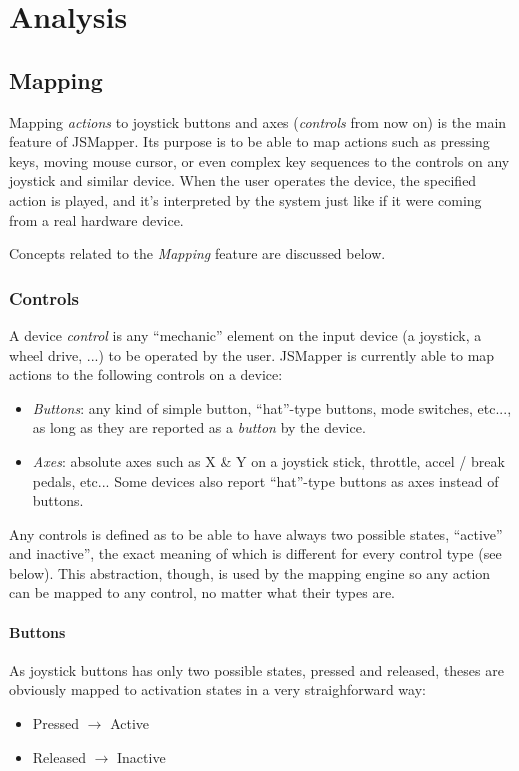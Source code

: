 \chapter{Analysis}\label{chap:analysis}

\section{Mapping}
Mapping \emph{actions} to joystick buttons and axes (\emph{controls} from now on) is the main feature of JSMapper. Its purpose is to be able to map actions such as pressing keys, moving mouse cursor, or even complex key sequences to the controls on any joystick and similar device. When the user operates the device, the specified action is played, and it's interpreted by the system just like if it were coming from a real hardware device.

Concepts related to the \emph{Mapping} feature are discussed below.

\subsection{Controls}
A device \emph{control} is any ``mechanic'' element on the input device (a joystick, a wheel drive, ...) to be operated by the user. JSMapper is currently able to map actions to the following controls on a device:
\begin{itemize}
	\item \emph{Buttons}: any kind of simple button, ``hat''-type buttons, mode switches, etc..., as long as they are reported as a \emph{button} by the device.
	\item \emph{Axes}: absolute axes such as X \& Y on a joystick stick, throttle, accel / break pedals, etc... Some devices also report ``hat''-type buttons as axes instead of buttons.
\end{itemize}

Any controls is defined as to be able to have always two possible states, ``active'' and inactive'', the exact meaning of which is different for every control type (see below). This abstraction, though, is used by the mapping engine so any action can be mapped to any control, no matter what their types are.

\subsubsection{Buttons}
As joystick buttons has only two possible states, pressed and released, theses are obviously mapped to activation states in a very straighforward way:
\begin{itemize}
	\item Pressed $\rightarrow$ Active
	\item Released $\rightarrow$ Inactive
\end{itemize}

